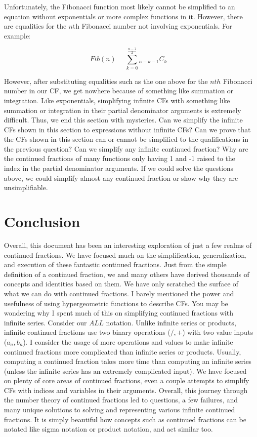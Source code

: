 \documentclass{article}
\begin{document}
Unfortunately, the Fibonacci function most likely cannot be simplified to an equation without exponentials or more complex functions in it. However, there are equalities for the $n$th Fibonacci number not involving exponentials. For example:

$$Fib(n)=\underset{k=0}{\overset{\frac{n-1}{2}}{\sum}} {}_{n-k-1} C_k $$

However, after substituting equalities such as the one above for the $nth$ Fibonacci number in our CF, we get nowhere because of something like summation or integration. Like exponentials, simplifying infinite CFs with something like summation or integration in their partial denominator arguments is extremely difficult. Thus, we end this section with mysteries. Can we simplify the infinite CFs shown in this section to expressions without infinite CFs? Can we prove that the CFs shown in this section can or cannot be simplified to the qualifications in the previous question? Can we simplify any infinite continued fraction? Why are the continued fractions of many functions only having 1 and -1 raised to the index in the partial denominator arguments. If we could solve the questions above, we could simplify almost any continued fraction or show why they are unsimplifiable.

\section{Conclusion}

Overall, this document has been an interesting exploration of just a few realms of continued fractions. We have focused much on the simplification, generalization, and execution of these fantastic continued fractions. Just from the simple definition of a continued fraction, we and many others have derived thousands of concepts and identities based on them. We have only scratched the surface of what we can do with continued fractions. I barely mentioned the power and usefulness of using hypergeometric functions to describe CFs. You may be wondering why I spent much of this on simplifying continued fractions with infinite series. Consider our $ALL$ notation. Unlike infinite series or products, infinite continued fractions use two binary operations ($/, +$) with two value inputs ($a_n,b_n$). I consider the usage of more operations and values to make infinite continued fractions more complicated than infinite series or products. Usually, computing a continued fraction takes more time than computing an infinite series (unless the infinite series has an extremely complicated input). We have focused on plenty of core areas of continued fractions, even a couple attempts to simplify CFs with indices and variables in their arguments. Overall, this journey through the number theory of continued fractions led to questions, a few failures, and many unique solutions to solving and representing various infinite continued fractions. It is simply beautiful how concepts such as continued fractions can be notated like sigma notation or product notation, and act similar too.
\end{document}
